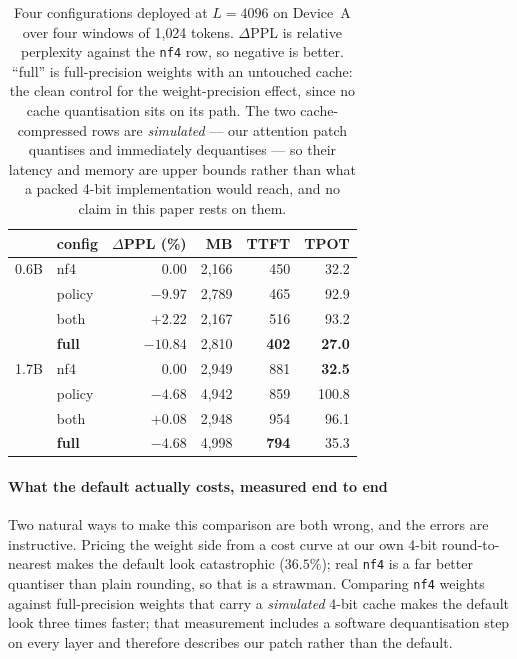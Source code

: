 \documentclass[5p]{elsarticle}
\begin{document}
\begin{table}[t]
\centering
\caption{Four configurations deployed at $L{=}4096$ on Device~A over four
windows of 1{,}024 tokens. $\Delta$PPL is relative perplexity against the
\texttt{nf4} row, so negative is better. ``full'' is full-precision weights with
an untouched cache: the clean control for the weight-precision effect, since no
cache quantisation sits on its path. The two cache-compressed rows are
\emph{simulated} --- our attention patch quantises and immediately dequantises ---
so their latency and memory are upper bounds rather than what a packed 4-bit
implementation would reach, and no claim in this paper rests on them.}
\label{tab:headtohead}
\begin{tabular}{@{}llrrrr@{}}
\toprule
 & config & $\Delta$PPL (\%) & MB & TTFT & TPOT \\
\midrule
0.6B & nf4     & $0.00$ & 2{,}166 & 450 & 32.2 \\
     & policy  & $\mathbf{-9.97}$ & 2{,}789 & 465 & 92.9 \\
     & both    & $+2.22$ & 2{,}167 & 516 & 93.2 \\
     & \textbf{full} & $\mathbf{-10.84}$ & 2{,}810 & \textbf{402} & \textbf{27.0} \\
\midrule
1.7B & nf4     & $0.00$ & 2{,}949 & 881 & \textbf{32.5} \\
     & policy  & $\mathbf{-4.68}$ & 4{,}942 & 859 & 100.8 \\
     & both    & $+0.08$ & 2{,}948 & 954 & 96.1 \\
     & \textbf{full} & $\mathbf{-4.68}$ & 4{,}998 & \textbf{794} & 35.3 \\
\bottomrule
\end{tabular}
\end{table}

\paragraph*{What the default actually costs, measured end to end}
Two natural ways to make this comparison are both wrong, and the errors are
instructive. Pricing the weight side from a cost curve at our own 4-bit
round-to-nearest makes the default look catastrophic ($36.5\%$); real \texttt{nf4}
is a far better quantiser than plain rounding, so that is a strawman. Comparing
\texttt{nf4} weights against full-precision weights that carry a \emph{simulated}
4-bit cache makes the default look three times faster; that measurement includes a
software dequantisation step on every layer and therefore describes our patch
rather than the default.
\end{document}
